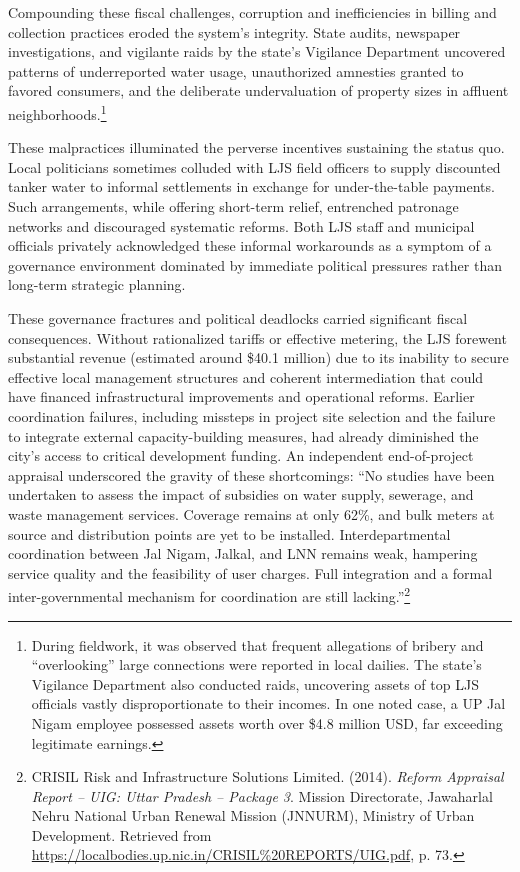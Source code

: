 Compounding these fiscal challenges, corruption and inefficiencies in billing and collection practices eroded the system’s integrity. State audits, newspaper investigations, and vigilante raids by the state’s Vigilance Department uncovered patterns of underreported water usage, unauthorized amnesties granted to favored consumers, and the deliberate undervaluation of property sizes in affluent neighborhoods.\footnote{During fieldwork, it was observed that frequent allegations of bribery and “overlooking” large connections were reported in local dailies. The state’s Vigilance Department also conducted raids, uncovering assets of top LJS officials vastly disproportionate to their incomes. In one noted case, a UP Jal Nigam employee possessed assets worth over \$4.8 million USD, far exceeding legitimate earnings.}

These malpractices illuminated the perverse incentives sustaining the status quo. Local politicians sometimes colluded with LJS field officers to supply discounted tanker water to informal settlements in exchange for under-the-table payments. Such arrangements, while offering short-term relief, entrenched patronage networks and discouraged systematic reforms. Both LJS staff and municipal officials privately acknowledged these informal workarounds as a symptom of a governance environment dominated by immediate political pressures rather than long-term strategic planning.

These governance fractures and political deadlocks carried significant fiscal consequences. Without rationalized tariffs or effective metering, the LJS forewent substantial revenue (estimated around  \$40.1 million) due to its inability to secure effective local management structures and coherent intermediation that could have financed infrastructural improvements and operational reforms. Earlier coordination failures, including missteps in project site selection and the failure to integrate external capacity-building measures, had already diminished the city’s access to critical development funding. An independent end-of-project appraisal underscored the gravity of these shortcomings: “No studies have been undertaken to assess the impact of subsidies on water supply, sewerage, and waste management services. Coverage remains at only 62\%, and bulk meters at source and distribution points are yet to be installed. Interdepartmental coordination between Jal Nigam, Jalkal, and LNN remains weak, hampering service quality and the feasibility of user charges. Full integration and a formal inter-governmental mechanism for coordination are still lacking.”\footnote{CRISIL Risk and Infrastructure Solutions Limited. (2014). \textit{Reform Appraisal Report – UIG: Uttar Pradesh – Package 3}. Mission Directorate, Jawaharlal Nehru National Urban Renewal Mission (JNNURM), Ministry of Urban Development. Retrieved from \url{https://localbodies.up.nic.in/CRISIL\%20REPORTS/UIG.pdf}, p. 73.}

